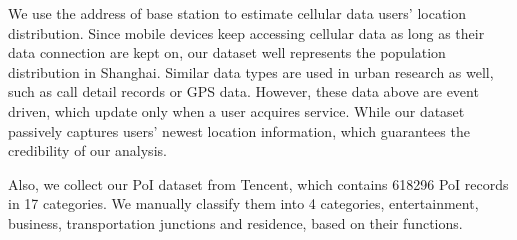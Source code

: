 \documentclass[letterpaper]{article} %
\begin{document}
We use the address of base station to estimate cellular data users' location distribution. Since mobile devices keep accessing cellular data as long as their data connection are kept on, our dataset well represents the population distribution in Shanghai. Similar data types are used in urban research as well, such as call detail records \cite{isaacman2012human,ficek2012inter} or GPS data\cite{zheng2008understanding}. However, these data above are event driven, which update only when a user acquires service. While our dataset passively captures users' newest location information, which guarantees the credibility of our analysis.

Also, we collect our PoI dataset from Tencent, which contains 618296 PoI records in 17 categories. We manually classify them into 4 categories, entertainment, business, transportation junctions and residence, based on their functions.

\begin{table}[h]
    \label{tab:poi classification}
    \caption{PoI Classification from original categories into aggregated categories.}
\end{table}
\end{document}
